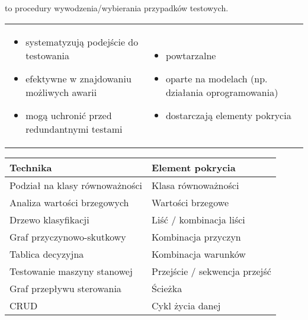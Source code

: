 \documentclass[../main.tex]{subfiles}
\begin{document}
    to procedury wywodzenia/wybierania przypadków testowych.

    \begin{table}[H]
        \begin{center}
            \begin{tabular}{p{8cm} p{8cm}}
                \begin{itemize}
                    \item systematyzują podejście do testowania
                    \item efektywne w znajdowaniu możliwych awarii
                    \item mogą uchronić przed redundantnymi testami
                \end{itemize}
                &
                \begin{itemize}
                    \item powtarzalne
                    \item oparte na modelach (np. działania oprogramowania)
                    \item dostarczają elementy pokrycia
                \end{itemize}
            \end{tabular}
        \end{center}
    \end{table}


    \begin{tabular}{|p{8cm}|p{8cm}|}
        \hline
        \textbf{Technika}              & \textbf{Element pokrycia}     \\
        \hline
        \hline
        Podział na klasy równoważności & Klasa równoważności           \\
        \hline
        Analiza wartości brzegowych    & Wartości brzegowe             \\
        \hline
        Drzewo klasyfikacji            & Liść / kombinacja liści       \\
        \hline
        Graf przyczynowo-skutkowy      & Kombinacja przyczyn           \\
        \hline
        Tablica decyzyjna              & Kombinacja warunków           \\
        \hline
        Testowanie maszyny stanowej    & Przejście / sekwencja przejść \\
        \hline
        Graf przepływu sterowania      & Ścieżka                       \\
        \hline
        CRUD                           & Cykl życia danej              \\
        \hline
    \end{tabular}
\end{document}
